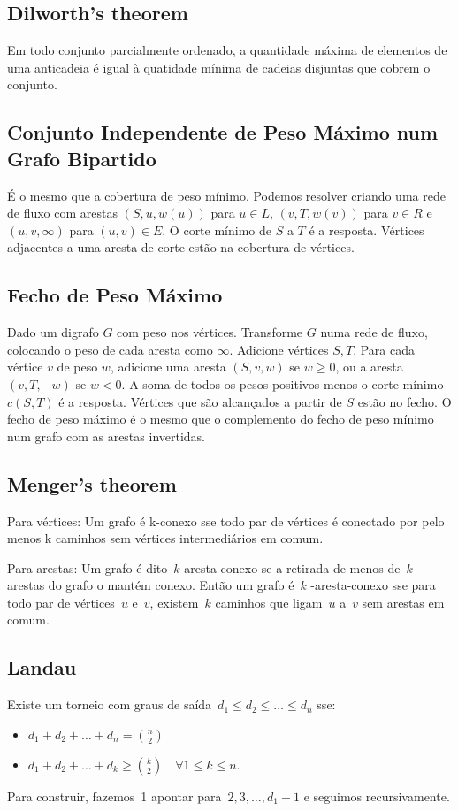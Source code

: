 \subsection{Dilworth's theorem}
Em todo conjunto parcialmente ordenado, a quantidade máxima de elementos de uma anticadeia é igual à  quatidade mínima de cadeias disjuntas que cobrem o conjunto.

\subsection{Conjunto Independente de Peso Máximo num Grafo Bipartido}
É o mesmo que a cobertura de peso mínimo. Podemos resolver criando uma rede de fluxo com arestas $(S,u,w(u))$ para $u\in L$,
$(v,T,w(v))$ para $v\in R$ e $(u,v,\infty)$ para $(u,v)\in E$. O corte mínimo de $S$ a $T$ é a resposta. Vértices adjacentes a uma aresta de corte estão na cobertura de vértices.

\subsection{Fecho de Peso Máximo}
Dado um digrafo $G$ com peso nos vértices. Transforme $G$ numa rede de fluxo, colocando o peso de cada aresta como $\infty$. Adicione vértices $S,T$. Para cada vértice $v$ de peso $w$, adicione uma aresta $(S, v, w)$ se $w\geq 0$, ou a aresta $(v,T,-w)$ se $w<0$. A soma de todos os pesos positivos menos o corte mínimo $c(S,T)$ é a resposta. Vértices que são alcançados a partir de $S$ estão no fecho. O fecho de peso máximo é o mesmo que o complemento do fecho de peso mínimo num grafo com as arestas invertidas.

\subsection{Menger's theorem}
\item Para vértices:
Um grafo é k-conexo sse todo par de vértices é conectado por pelo menos k caminhos sem vértices intermediários em comum.
\item Para arestas:
Um grafo é dito~$k$-aresta-conexo se a retirada de menos de~$k$ arestas do grafo o mantém conexo. Então um grafo é~$k$ -aresta-conexo sse para todo par de vértices~$u$ e~$v$, existem~$k$ caminhos que ligam~$u$ a~$v$ sem arestas em comum.

\subsection{Landau}
Existe um torneio com graus de saída~$d_1 \leq d_2 \leq \ldots \leq d_n$ sse:
\begin{itemize}
\item $d_1 + d_2 + \ldots + d_n = {n \choose 2}$\newline
\item $d_1 + d_2 + \ldots + d_k \geq {k \choose 2} \quad \forall 1 \leq k \leq n.$
\end{itemize}
Para construir, fazemos~1 apontar para~$2, 3, \ldots, d_1 + 1$ e seguimos recursivamente.

